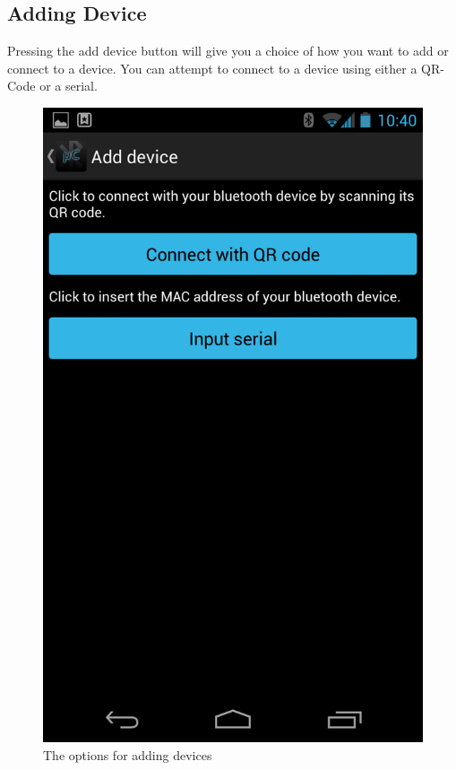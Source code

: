 		\subsection{Adding Device}
			Pressing the add device button will give you a choice of how you want to add or connect to a device. You can attempt to connect to a device using either a QR-Code or a serial.
		\newline
		\begin{figure}[H]
			\centering
			\includegraphics[scale = 0.3]{images/Screenshots/add_device.png}
			\caption{The options for adding devices}
		\end{figure}


